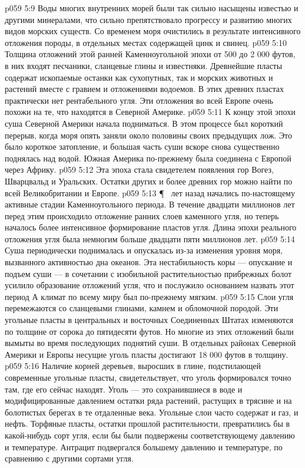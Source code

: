 \vs p059 5:9 Воды многих внутренних морей были так сильно насыщены известью и другими минералами, что сильно препятствовало прогрессу и развитию многих видов морских существ. Со временем моря очистились в результате интенсивного отложения породы, в отдельных местах содержащей цинк и свинец.
\vs p059 5:10 Толщина отложений этой ранней Каменноугольной эпохи от 500 до 2 000 футов, в них входят песчаники, сланцевые глины и известняки. Древнейшие пласты содержат ископаемые останки как сухопутных, так и морских животных и растений вместе с гравием и отложениями водоемов. В этих древних пластах практически нет рентабельного угля. Эти отложения во всей Европе очень похожи на те, что находятся в Северной Америке.
\vs p059 5:11 К концу этой эпохи суша Северной Америки начала подниматься. В этом процессе был короткий перерыв, когда моря опять заняли около половины своих предыдущих лож. Это было короткое затопление, и большая часть суши вскоре снова существенно поднялась над водой. Южная Америка по\hyp{}прежнему была соединена с Европой через Африку.
\vs p059 5:12 Эта эпоха стала свидетелем появления гор Вогез, Шварцвальд и Уральских. Остатки других и более древних гор можно найти по всей Великобритании и Европе.
\vs p059 5:13 \P\  лет назад начались по\hyp{}настоящему активные стадии Каменноугольного периода. В течение двадцати миллионов лет перед этим происходило отложение ранних слоев каменного угля, но теперь началось более интенсивное формирование пластов угля. Длина эпохи реального отложения угля была немногим больше двадцати пяти миллионов лет.
\vs p059 5:14 Суша периодически поднималась и опускалась из\hyp{}за изменения уровня моря, вызванного активностью дна океанов. Эта нестабильность коры --- опускание и подъем суши --- в сочетании с изобильной растительностью прибрежных болот усилило образование отложений угля, что и послужило основанием назвать этот период  А климат по всему миру был по\hyp{}прежнему мягким.
\vs p059 5:15 Слои угля перемежаются со сланцевыми глинами, камнем и обломочной породой. Эти угольные пласты в центральных и восточных Соединенных Штатах изменяются по толщине от сорока до пятидесяти футов. Но многие из этих отложений были вымыты во время последующих поднятий суши. В отдельных районах Северной Америки и Европы несущие уголь пласты достигают 18 000 футов в толщину.
\vs p059 5:16 Наличие корней деревьев, выросших в глине, подстилающей современные угольные пласты, свидетельствует, что уголь формировался точно там, где его сейчас находят. Уголь --- это сохранившиеся в воде и модифицированные давлением остатки ряда растений, растущих в трясине и на болотистых берегах в те отдаленные века. Угольные слои часто содержат и газ, и нефть. Торфяные пласты, остатки прошлой растительности, превратились бы в какой\hyp{}нибудь сорт угля, если бы были подвержены соответствующему давлению и температуре. Антрацит подвергался большему давлению и температуре, по сравнению с другими сортами угля.
